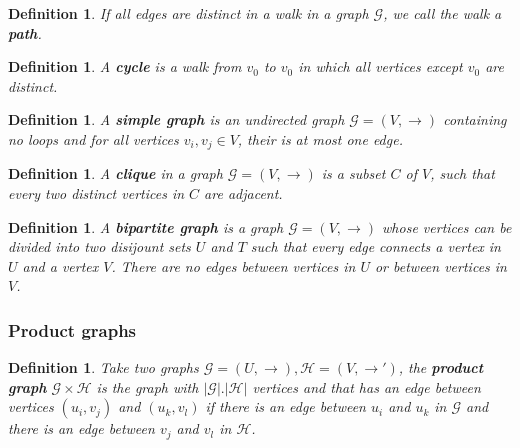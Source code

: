 \documentclass[a4paper,11pt]{report}
\newtheorem{definition}[theorem]{Definition}
\newcommand{\graf}{\mathscr{G}}
\newcommand{\grafeen}{\mathscr{H}}
\begin{document}
 \begin{definition}
   If all edges are distinct in a  walk in a graph $\graf$, we call the walk a \textbf{path}.
 \end{definition}
 
 \begin{definition}
   A \textbf{cycle} is a walk from $v_0$ to $v_0$ in which all vertices except $v_0$ are distinct. \end{definition}
  
  


\begin{definition}\label{simplegraph} A \textbf{simple graph} is an undirected graph $\graf=(V,\to)$ containing no loops and for all vertices $v_i, v_j \in V$, their is at most one edge.\end{definition}
 
 \begin{definition}\label{clique}
   A \textbf{clique} in a graph $\graf = (V, \to)$ is a subset $C$ of $V$, such 
   that every two distinct vertices in $C$ are adjacent. 
 \end{definition}
 
  \begin{definition}\label{bipartite}
   A \textbf{bipartite graph} is a graph $\graf = (V, \to)$ whose vertices can 
   be divided into two disijount sets $U$ and $T$ such that every edge connects 
   a vertex in $U$ and a vertex $V$. There are no edges between vertices in $U$ 
   or between vertices in $V$.
 \end{definition}
 \subsubsection{Product graphs}
 \begin{definition}\label{productgraph}
   Take two graphs $\graf=(U,\to), \grafeen=(V,\to')$, the \textbf{product graph} $\graf \times \grafeen$ 
   is the graph with $|\graf|.|\grafeen|$ vertices and that has an edge between 
   vertices $(u_i, v_j)$ and $(u_k, v_l)$ if there is an edge between $u_i$ and $u_k$ in $\graf$ and there is an 
   edge between $v_j$ and $v_l$ in $\grafeen$. 
 \end{definition}
 
\end{document}

